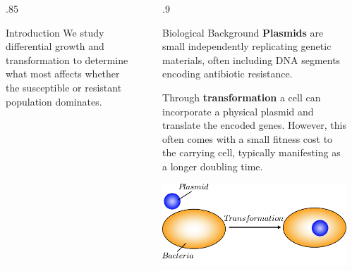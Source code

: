 \documentclass[final]{beamer}
\newlength{\sepwid}
\newlength{\onecolwid}
\newlength{\figwid}
\begin{document}
\begin{frame}[t]
\begin{block}
\begin{columns}[t]
\begin{column}{.85\onecolwid}
\begin{alertblock}{Introduction}
  \quad\quad We study differential growth and transformation to
  determine what most affects whether the susceptible or resistant population
  dominates.
  \end{alertblock}
\end{column}

\begin{column}{\sepwid}\end{column} %

\begin{column}{.9\onecolwid}
  \begin{alertblock}{Biological Background}
    \textbf{Plasmids} are small independently replicating genetic materials,
    often including DNA segments encoding antibiotic resistance.

    \quad\quad Through \textbf{transformation} a cell can incorporate
    a physical plasmid and translate the encoded genes. However, this often
    comes with a small fitness cost to the carrying cell, typically manifesting
    as a longer doubling time.

    \begin{center}
      \includegraphics[width=.8\figwid]{../dev/graphics/poster/transformation.pdf}
    \end{center}
  \end{alertblock}
\end{column}

\begin{column}{\sepwid}\end{column} %


\end{columns}
\end{block}
\end{frame}
\end{document}
